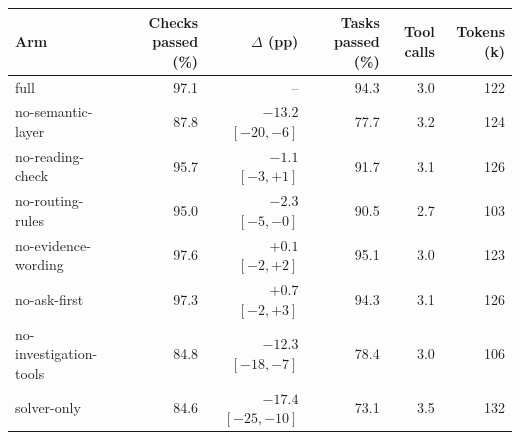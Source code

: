\begin{tabular}{lrrrrr}
\toprule
Arm & Checks passed (\%) & $\Delta$ (pp) & Tasks passed (\%) & Tool calls & Tokens (k) \\
\midrule
full & 97.1 & -- & 94.3 & 3.0 & 122 \\
no-semantic-layer & 87.8 & $-13.2$ $[-20, -6]$ & 77.7 & 3.2 & 124 \\
no-reading-check & 95.7 & $-1.1$ $[-3, +1]$ & 91.7 & 3.1 & 126 \\
no-routing-rules & 95.0 & $-2.3$ $[-5, -0]$ & 90.5 & 2.7 & 103 \\
no-evidence-wording & 97.6 & $+0.1$ $[-2, +2]$ & 95.1 & 3.0 & 123 \\
no-ask-first & 97.3 & $+0.7$ $[-2, +3]$ & 94.3 & 3.1 & 126 \\
no-investigation-tools & 84.8 & $-12.3$ $[-18, -7]$ & 78.4 & 3.0 & 106 \\
solver-only & 84.6 & $-17.4$ $[-25, -10]$ & 73.1 & 3.5 & 132 \\
\bottomrule
\end{tabular}
